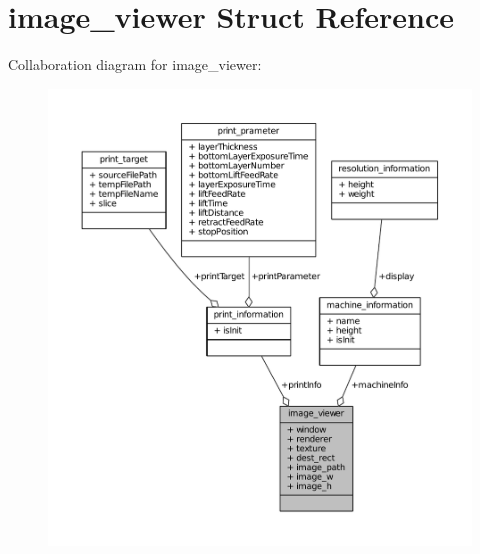 \hypertarget{structimage__viewer}{}\section{image\+\_\+viewer Struct Reference}
\label{structimage__viewer}


Collaboration diagram for image\+\_\+viewer\+:\nopagebreak
\begin{figure}[H]
\begin{center}
\leavevmode
\includegraphics[width=350pt]{structimage__viewer__coll__graph}
\end{center}
\end{figure}
